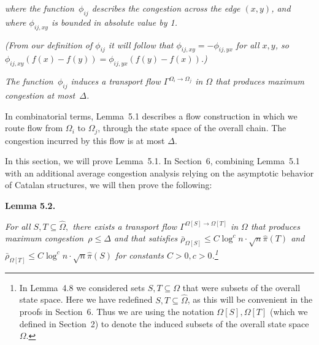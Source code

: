 \emph{where the function $\phi_{ij}$ describes the congestion across the edge $(x,y)$, and where $\phi_{ij,xy}$ is bounded in absolute value by 1.}\par




\emph{(From our definition of $\phi_{ij}$ it will follow that $\phi_{ij,xy}=-\phi_{ij,yx}$ for all $x,y$, so $\phi_{ij,xy}(f(x)-f(y))=\phi_{ij,yx}(f(y)-f(x))$.)}\par




\emph{The function $\phi_{ij}$ induces a
transport flow $\Gamma^{\Omega_{i}\rightarrow\Omega_{j}}$ in $\Omega$ that produces maximum congestion at most $\Delta$.}\par






In combinatorial terms, Lemma 5.1 describes a flow construction in which we route flow from $\Omega_{i}$ to $\Omega_{j}$, through the state space of the overall chain. The congestion incurred by this flow is at most $\Delta$.\par




In this section, we will prove Lemma 5.1. In Section 6, combining Lemma 5.1 with an additional average congestion analysis relying on the asymptotic behavior of Catalan structures, we will then prove the following:\par





\par\medskip\noindent\textbf{\textbf{Lemma 5.2}\textbf{.}}\par



{\itshape For all $S,T\subseteq\hat{\Omega},$ there exists a transport flow $\Gamma^{\Omega[S]\rightarrow\Omega[T]}$ in $\Omega$ that produces maximum congestion $\rho\leq\Delta$ and that satisfies $\bar{\rho}_{\Omega[S]}\leq C\log^{c}n\cdot\sqrt{n}\hat{\pi}(T)$ and $\bar{\rho}_{\Omega[T]}\leq C\log^{c}n\cdot\sqrt{n}\hat{\pi}(S)$ for constants $C>0,c>0$.\footnote{
                  
                  
                  
                  
                  
                  
                  
                  
                In Lemma 4.8 we considered sets $S,T\subseteq\Omega$ that were subsets of the overall state space. Here we have redefined $S,T\subseteq\hat{\Omega}$, as this will be convenient in the proofs in Section 6. Thus we are using the notation $\Omega[S],\Omega[T]$ (which we defined in Section 2) to denote the induced subsets of the overall state space $\Omega$.}}\par



